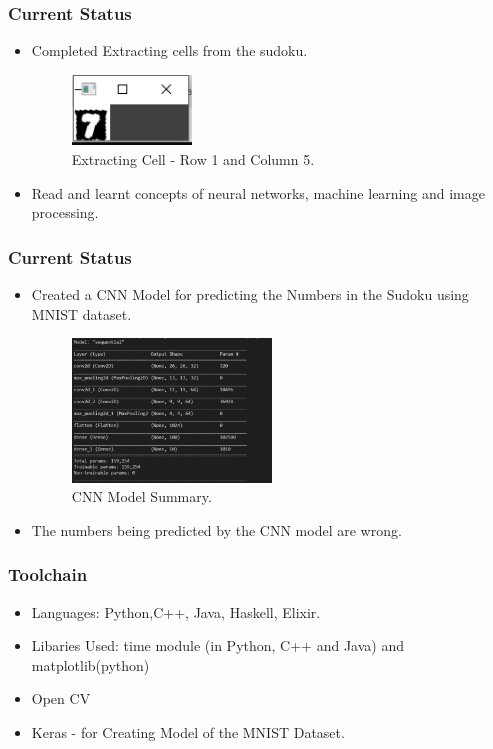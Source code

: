 \documentclass{beamer}
\begin{document}
\begin{frame}
	\frametitle{Current Status}
	\begin{itemize}
		  \item Completed Extracting cells from the sudoku.
			\begin{figure}
			  \includegraphics[width=0.3\textwidth]{./week8_img/cell.PNG}
		  \caption{Extracting Cell - Row 1 and Column 5.}
		  \centering
		  \end{figure}
   		  \item Read and learnt concepts of neural networks, machine learning and image processing.
	\end{itemize}
\end{frame}

\begin{frame}
	\frametitle{Current Status}
	\begin{itemize}
		\item Created a CNN Model for predicting the Numbers in the Sudoku using MNIST dataset.
		  \begin{figure}
			  \includegraphics[width=0.5\textwidth]{./week8_img/CNNModel.PNG}
		  \caption{CNN Model Summary.}
		  \centering
		  \end{figure}
   		  \item The numbers being predicted by the CNN model are wrong.
	\end{itemize}
\end{frame}

\begin{frame}
     \frametitle{Toolchain}
     \begin{itemize}
          \item Languages: Python,C++, Java, Haskell, Elixir.
          \item Libaries Used: time module (in Python, C++ and Java) and matplotlib(python)
          \item Open CV 
		  \item Keras - for Creating Model of the MNIST Dataset.
     \end{itemize}
\end{frame}
\end{document}
